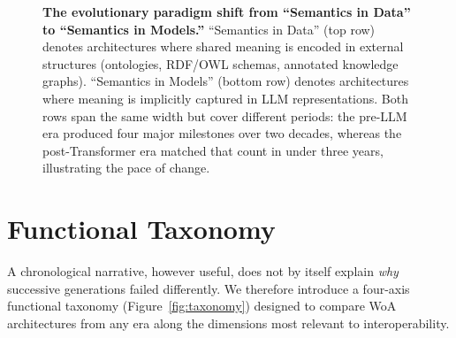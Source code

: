 \documentclass[10pt,twocolumn]{article}
\begin{document}
\begin{figure}[!t]
{%
}%
\caption{\textbf{The evolutionary paradigm shift from ``Semantics in Data'' to ``Semantics in Models.''}
``Semantics in Data'' (top row) denotes architectures where shared meaning is encoded in external structures (ontologies, RDF/OWL schemas, annotated knowledge graphs). ``Semantics in Models'' (bottom row) denotes architectures where meaning is implicitly captured in LLM representations. Both rows span the same width but cover different periods: the pre-LLM era produced four major milestones over two decades, whereas the post-Transformer era matched that count in under three years, illustrating the pace of change.}
\label{fig:history}
\end{figure}


\section{Functional Taxonomy}\label{sec:taxonomy}

A chronological narrative, however useful, does not by itself explain \emph{why} successive generations failed differently. We therefore introduce a four-axis functional taxonomy (Figure~\ref{fig:taxonomy}) designed to compare WoA architectures from any era along the dimensions most relevant to interoperability.
\end{document}
